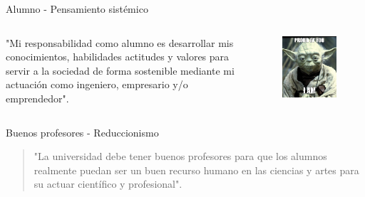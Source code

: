 \documentclass{beamer}
\begin{document}
\begin{frame}{Alumno - Pensamiento sistémico}
	
	\begin{columns}
		\begin{column}{0.5\textwidth}
				"Mi responsabilidad como alumno es desarrollar mis conocimientos, habilidades actitudes y valores para servir a la sociedad de forma sostenible mediante mi actuación como ingeniero, empresario y/o emprendedor".
		\end{column}
		\begin{column}{0.5\textwidth}  %
		\begin{figure}
			\centering
			\includegraphics[width=0.9\linewidth]{img/yoda}	
		\end{figure}
		\end{column}
	\end{columns}
\end{frame}

\begin{frame}{Buenos profesores - Reduccionismo}
		\begin{quote}
	"La universidad debe tener buenos profesores para que los alumnos realmente puedan ser un buen recurso humano en las ciencias y artes para su actuar científico y profesional".
\end{quote}
\end{frame}
\end{document}
